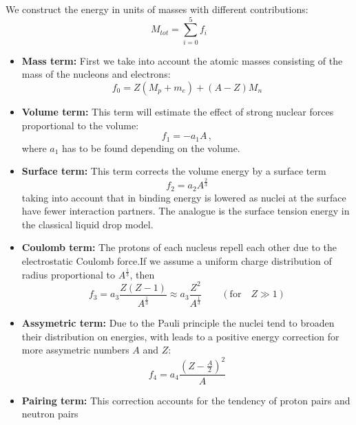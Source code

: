 We construct the energy in units of masses with different contributions:
\begin{equation}
    M_{tot} = \sum_{i=0}^{5} f_i 
\end{equation}
\begin{itemize}
    \item \textbf{Mass term:} 
First we take into account the atomic masses 
consisting of the mass of the nucleons and electrons:
\begin{equation}
    f_0 = Z(M_p + m_e) + (A-Z)M_n
\end{equation}
    \item \textbf{Volume term:} This term will estimate the effect of strong 
        nuclear forces proportional to the volume:
        \begin{equation}
            f_1 = -a_1 A\, ,
        \end{equation}
        where $a_1$ has to be found depending on the volume. 
    \item \textbf{Surface term:} 
        This term corrects the volume energy by a surface term
        \begin{equation}
            f_2 = a_2 A^{\frac{2}{3}} 
        \end{equation}
        taking into account that in binding energy is lowered as nuclei at the surface 
        have fewer interaction partners. The analogue is the surface tension energy 
        in the classical liquid drop model.
    \item \textbf{Coulomb term:} The protons of each nucleus repell each other due to the 
        electrostatic Coulomb force.If we assume a uniform charge distribution of 
        radius proportional to $A^{\frac{1}{3}}$, then
        \begin{equation}
            f_3 = a_3 \frac{Z(Z-1)}{A^{\frac{1}{3}}} \approx a_3 \frac{Z^2}{A^{\frac{1}{3}}} 
            \qquad (\text{for} \quad Z \gg 1)
        \end{equation}
    \item \textbf{Assymetric term:} Due to the Pauli principle the nuclei tend to broaden their distribution
        on energies, with leads to a positive energy correction for more assymetric numbers $A$ and $Z$:
        \begin{equation}
            f_4 = a_4 \frac{(Z- \frac{A}{2})^2}{A}
        \end{equation}
    \item \textbf{Pairing term:} This correction accounts for the tendency of proton pairs and neutron pairs

\end{itemize}

